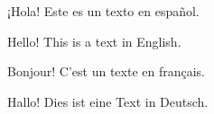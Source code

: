 \documentclass{article}
\begin{document}
¡Hola! Este es un texto en español.

Hello! This is a text in English.

Bonjour! C'est un texte en français.

Hallo! Dies ist eine Text in Deutsch.
\end{document}
